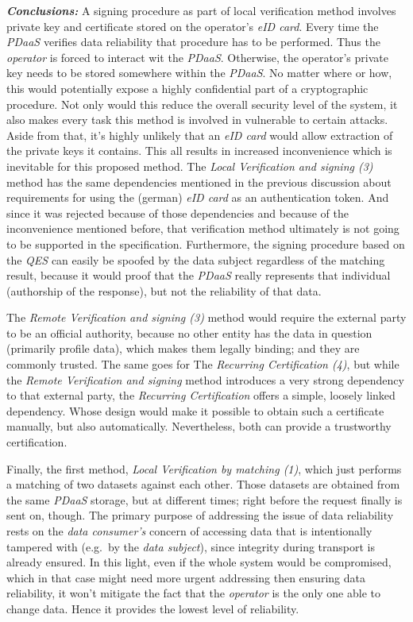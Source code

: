\documentclass[12pt,english,a4paper,titlepage,cleardoublepage=empty,dottedtoc]{report}
\begin{document}
\emph{\textbf{Conclusions:}} A signing procedure as part of local
verification method involves private key and certificate stored on the
operator's \emph{eID card}. Every time the \emph{PDaaS} verifies data
reliability that procedure has to be performed. Thus the \emph{operator}
is forced to interact wit the \emph{PDaaS}. Otherwise, the operator's
private key needs to be stored somewhere within the \emph{PDaaS}. No
matter where or how, this would potentially expose a highly confidential
part of a cryptographic procedure. Not only would this reduce the
overall security level of the system, it also makes every task this
method is involved in vulnerable to certain attacks. Aside from that,
it's highly unlikely that an \emph{eID card} would allow extraction of
the private keys it contains. This all results in increased
inconvenience which is inevitable for this proposed method. The
\emph{Local Verification and signing (3)} method has the same
dependencies mentioned in the previous discussion about requirements for
using the (german) \emph{eID card} as an authentication token. And since
it was rejected because of those dependencies and because of the
inconvenience mentioned before, that verification method ultimately is
not going to be supported in the specification. Furthermore, the signing
procedure based on the \emph{QES} can easily be spoofed by the data
subject regardless of the matching result, because it would proof that
the \emph{PDaaS} really represents that individual (authorship of the
response), but not the reliability of that data.

The \emph{Remote Verification and signing (3)} method would require the
external party to be an official authority, because no other entity has
the data in question (primarily profile data), which makes them legally
binding; and they are commonly trusted. The same goes for The
\emph{Recurring Certification (4)}, but while the \emph{Remote
Verification and signing} method introduces a very strong dependency to
that external party, the \emph{Recurring Certification} offers a simple,
loosely linked dependency. Whose design would make it possible to obtain
such a certificate manually, but also automatically. Nevertheless, both
can provide a trustworthy certification.

Finally, the first method, \emph{Local Verification by matching (1)},
which just performs a matching of two datasets against each other. Those
datasets are obtained from the same \emph{PDaaS} storage, but at
different times; right before the request finally is sent on, though.
The primary purpose of addressing the issue of data reliability rests on
the \emph{data consumer's} concern of accessing data that is
intentionally tampered with (e.g.~by the \emph{data subject}), since
integrity during transport is already ensured. In this light, even if
the whole system would be compromised, which in that case might need
more urgent addressing then ensuring data reliability, it won't mitigate
the fact that the \emph{operator} is the only one able to change data.
Hence it provides the lowest level of reliability.
\end{document}
